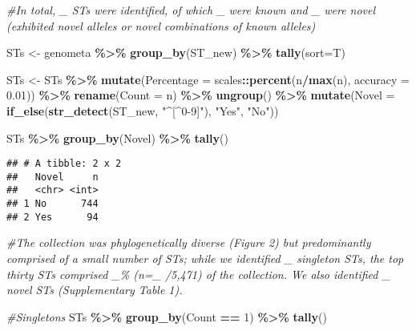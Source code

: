 \documentclass[
]{article}
\newenvironment{Shaded}{\begin{snugshade}}{\end{snugshade}}
\newcommand{\AttributeTok}[1]{\textcolor[rgb]{0.13,0.29,0.53}{#1}}
\newcommand{\CommentTok}[1]{\textcolor[rgb]{0.56,0.35,0.01}{\textit{#1}}}
\newcommand{\DecValTok}[1]{\textcolor[rgb]{0.00,0.00,0.81}{#1}}
\newcommand{\FloatTok}[1]{\textcolor[rgb]{0.00,0.00,0.81}{#1}}
\newcommand{\FunctionTok}[1]{\textcolor[rgb]{0.13,0.29,0.53}{\textbf{#1}}}
\newcommand{\NormalTok}[1]{#1}
\newcommand{\OtherTok}[1]{\textcolor[rgb]{0.56,0.35,0.01}{#1}}
\newcommand{\SpecialCharTok}[1]{\textcolor[rgb]{0.81,0.36,0.00}{\textbf{#1}}}
\newcommand{\StringTok}[1]{\textcolor[rgb]{0.31,0.60,0.02}{#1}}
\begin{document}
\begin{Shaded}
\begin{Highlighting}[]
\CommentTok{\#In total, \_ STs were identified, of which \_ were known and \_ were novel (exhibited novel alleles or novel combinations of known alleles)}

\NormalTok{STs }\OtherTok{\textless{}{-}}\NormalTok{ genometa }\SpecialCharTok{\%\textgreater{}\%} \FunctionTok{group\_by}\NormalTok{(ST\_new) }\SpecialCharTok{\%\textgreater{}\%} \FunctionTok{tally}\NormalTok{(}\AttributeTok{sort=}\NormalTok{T)}

\NormalTok{STs }\OtherTok{\textless{}{-}}\NormalTok{ STs }\SpecialCharTok{\%\textgreater{}\%} \FunctionTok{mutate}\NormalTok{(}\AttributeTok{Percentage =}\NormalTok{ scales}\SpecialCharTok{::}\FunctionTok{percent}\NormalTok{(n}\SpecialCharTok{/}\FunctionTok{max}\NormalTok{(n), }\AttributeTok{accuracy =} \FloatTok{0.01}\NormalTok{)) }\SpecialCharTok{\%\textgreater{}\%} \FunctionTok{rename}\NormalTok{(}\StringTok{\textquotesingle{}Count\textquotesingle{}} \OtherTok{=}\NormalTok{ n) }\SpecialCharTok{\%\textgreater{}\%} \FunctionTok{ungroup}\NormalTok{() }\SpecialCharTok{\%\textgreater{}\%} \FunctionTok{mutate}\NormalTok{(}\AttributeTok{Novel =} \FunctionTok{if\_else}\NormalTok{(}\FunctionTok{str\_detect}\NormalTok{(ST\_new, }\StringTok{"\^{}[\^{}0{-}9]"}\NormalTok{), }\StringTok{"Yes"}\NormalTok{, }\StringTok{"No"}\NormalTok{))}

\NormalTok{STs }\SpecialCharTok{\%\textgreater{}\%} \FunctionTok{group\_by}\NormalTok{(Novel) }\SpecialCharTok{\%\textgreater{}\%} \FunctionTok{tally}\NormalTok{()}
\end{Highlighting}
\end{Shaded}

\begin{verbatim}
## # A tibble: 2 x 2
##   Novel     n
##   <chr> <int>
## 1 No      744
## 2 Yes      94
\end{verbatim}

\begin{Shaded}
\begin{Highlighting}[]
\CommentTok{\#The collection was phylogenetically diverse (Figure 2) but predominantly comprised of a small number of STs; while we identified \_ singleton STs, the top thirty STs comprised \_\% (n=\_ /5,471) of the collection. We also identified \_ novel STs (Supplementary Table 1).}

\CommentTok{\#Singletons}
\NormalTok{STs }\SpecialCharTok{\%\textgreater{}\%} \FunctionTok{group\_by}\NormalTok{(Count }\SpecialCharTok{==} \DecValTok{1}\NormalTok{) }\SpecialCharTok{\%\textgreater{}\%} \FunctionTok{tally}\NormalTok{()}
\end{Highlighting}
\end{Shaded}
\end{document}
